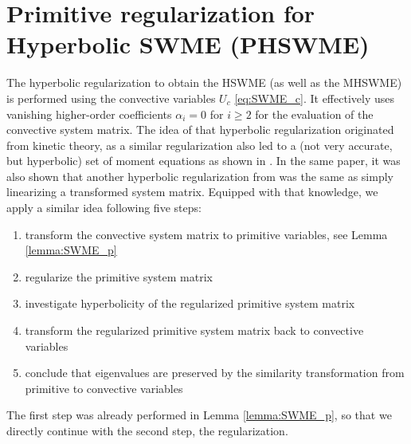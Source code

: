 \documentclass[a4paper, 11pt]{article}
\begin{document}
\section{Primitive regularization for Hyperbolic SWME (PHSWME)}
\label{sec:new_hyp}
The hyperbolic regularization to obtain the HSWME (as well as the MHSWME) is performed using the convective variables $U_{c}$ \eqref{eq:SWME_c}. It effectively uses vanishing higher-order coefficients $\alpha_i = 0$ for $i \geq 2$ for the evaluation of the convective system matrix.
The idea of that hyperbolic regularization originated from kinetic theory, as a similar regularization also led to a (not very accurate, but hyperbolic) set of moment equations as shown in \cite{Koellermeier2015}. In the same paper, it was also shown that another hyperbolic regularization from \cite{Cai2013b} was the same as simply linearizing a transformed system matrix. Equipped with that knowledge, we apply a similar idea following five steps:
\begin{enumerate}
    \item transform the convective system matrix to primitive variables, see Lemma \ref{lemma:SWME_p}
    \item regularize the primitive system matrix
    \item investigate hyperbolicity of the regularized primitive system matrix
    \item transform the regularized primitive system matrix back to convective variables
    \item conclude that eigenvalues are preserved by the similarity transformation from primitive to convective variables
\end{enumerate}

The first step was already performed in Lemma \ref{lemma:SWME_p}, so that we directly continue with the second step, the regularization.
\end{document}
